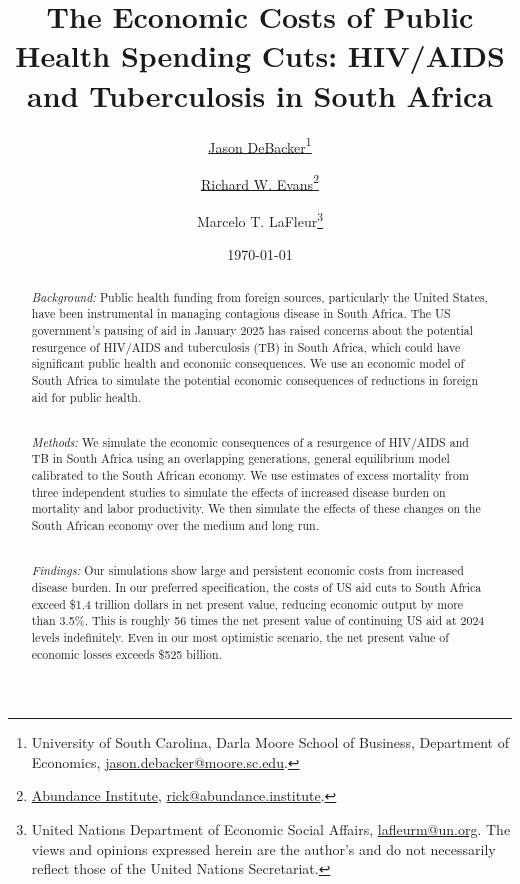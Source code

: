 \documentclass[letterpaper,12pt]{article}
\theoremstyle{definition}
\begin{document}
\begin{titlepage}
\title{The Economic Costs of Public Health Spending Cuts: HIV/AIDS and Tuberculosis in South Africa}
\date{\today}
\author{\href{http://jasondebacker.com/}{Jason DeBacker}\thanks{University of South Carolina, Darla Moore School of Business, Department of Economics, \href{mailto:jason.debacker@moore.sc.edu}{jason.debacker@moore.sc.edu}.}\and \href{https://sites.google.com/site/rickecon}{Richard W. Evans}\thanks{\href{https://abundance.institute/}{Abundance Institute}, \href{mailto:rick@abundance.institute}{rick@abundance.institute}.}\and {Marcelo T. LaFleur}\thanks{{United Nations Department of Economic Social Affairs}, \href{mailto:lafleurm@un.org}{lafleurm@un.org}. The views and opinions expressed herein are the author's and do not necessarily reflect those of the United Nations Secretariat.}}
\maketitle
\vspace{-2mm}
\begin{abstract}
\small{
\noindent \emph{Background:}
Public health funding from foreign sources, particularly the United States, have been instrumental in managing contagious disease in South Africa.  The US government's pausing of aid in January 2025 has raised concerns about the potential resurgence of HIV/AIDS and tuberculosis (TB) in South Africa, which could have significant public health and economic consequences.  We use an economic model of South Africa to simulate the potential economic consequences of reductions in foreign aid for public health.

\ \\
\emph{Methods:}
We simulate the economic consequences of a resurgence of HIV/AIDS and TB in South Africa using an overlapping generations, general equilibrium model calibrated to the South African economy.  We use estimates of excess mortality from three independent studies to simulate the effects of increased disease burden on mortality and labor productivity.  We then simulate the effects of these changes on the South African economy over the medium and long run.

\ \\
\emph{Findings:}
Our simulations show large and persistent economic costs from increased disease burden.  In our preferred specification, the costs of US aid cuts to South Africa exceed \$1.4 trillion dollars in net present value, reducing economic output by more than 3.5\%. This is roughly 56 times the net present value of continuing US aid at 2024 levels indefinitely. Even in our most optimistic scenario, the net present value of economic losses exceeds \$525 billion.

}
\end{abstract}
\end{titlepage}
\end{document}
